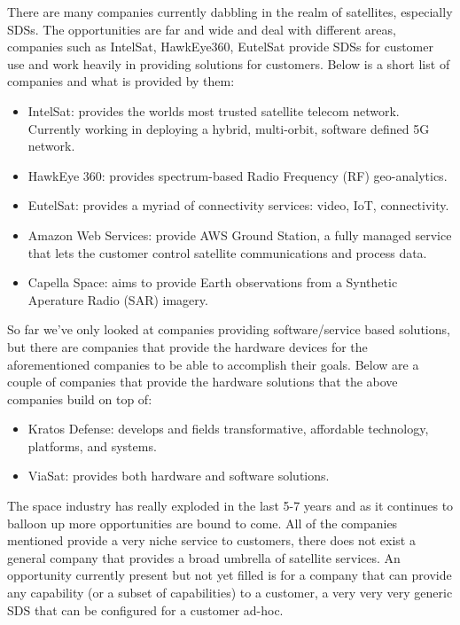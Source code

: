 \documentclass[../main.tex]{subfiles}
\begin{document}
There are many companies currently dabbling in the realm of satellites, especially SDSs. The opportunities are far and wide and deal with different areas, companies such as IntelSat, HawkEye360, EutelSat provide SDSs for customer use and work heavily in providing solutions for customers. Below is a short list of companies and what is provided by them:

\begin{itemize}
    \item IntelSat: provides the worlds most trusted satellite telecom network. Currently working in deploying a hybrid, multi-orbit, software defined 5G network.
    \item HawkEye 360: provides spectrum-based Radio Frequency (RF) geo-analytics.
    \item EutelSat: provides a myriad of connectivity services: video, IoT, connectivity.
    \item Amazon Web Services: provide AWS Ground Station, a fully managed service that lets the customer control satellite communications and process data.
    \item Capella Space: aims to provide Earth observations from a Synthetic Aperature Radio (SAR) imagery.
\end{itemize}

So far we've only looked at companies providing software/service based solutions, but there are companies that provide the hardware devices for the aforementioned companies to be able to accomplish their goals. Below are a couple of companies that provide the hardware solutions that the above companies build on top of:

\begin{itemize}
    \item Kratos Defense: develops and fields transformative, affordable technology, platforms, and systems.
    \item ViaSat: provides both hardware and software solutions.
\end{itemize}

The space industry has really exploded in the last 5-7 years and as it continues to balloon up more opportunities are bound to come. All of the companies mentioned provide a very niche service to customers, there does not exist a general company that provides a broad umbrella of satellite services. An opportunity currently present but not yet filled is for a company that can provide any capability (or a subset of capabilities) to a customer, a very very very generic SDS that can be configured for a customer ad-hoc.
\end{document}
